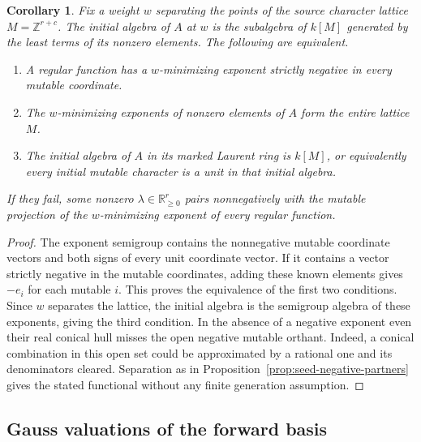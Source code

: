 \documentclass[11pt,reqno]{amsart}
\numberwithin{equation}{section}
\newtheorem{corollary}[theorem]{Corollary}
\theoremstyle{definition}
\theoremstyle{remark}
\begin{document}
\begin{corollary}\label{cor:negative-vertex-semigroup}
Fix a weight \(w\) separating the points of the source character lattice
\(M=\mathbb Z^{r+c}\). The \emph{initial algebra} of \(A\) at \(w\)
is the subalgebra of \(k[M]\) generated by the least terms of its
nonzero elements. The following are equivalent.
\begin{enumerate}
\item A regular function has a \(w\)-minimizing exponent strictly
negative in every mutable coordinate.
\item The \(w\)-minimizing exponents of nonzero elements of \(A\)
form the entire lattice \(M\).
\item The initial algebra of \(A\) in its marked Laurent ring is
\(k[M]\), or equivalently every initial mutable character is a unit
in that initial algebra.
\end{enumerate}
If they fail, some nonzero \(\lambda\in\mathbb R_{\ge0}^r\) pairs
nonnegatively with the mutable projection of the \(w\)-minimizing
exponent of every regular function.
\end{corollary}
\begin{proof}
The exponent semigroup contains the nonnegative mutable coordinate
vectors and both signs of every unit coordinate vector. If it contains
a vector strictly negative in the mutable coordinates, adding these
known elements gives \(-e_i\) for each mutable \(i\). This proves
the equivalence of the first two conditions. Since \(w\) separates
the lattice, the initial algebra is the semigroup algebra of these
exponents, giving the third condition. In the absence of a negative
exponent even their real conical hull misses the open negative
mutable orthant. Indeed, a conical combination in this open set could be
approximated by a rational one and its denominators cleared.
Separation as in Proposition~\ref{prop:seed-negative-partners}
gives the stated functional without any finite generation assumption.
\end{proof}

\subsection{Gauss valuations of the forward basis}
\end{document}
